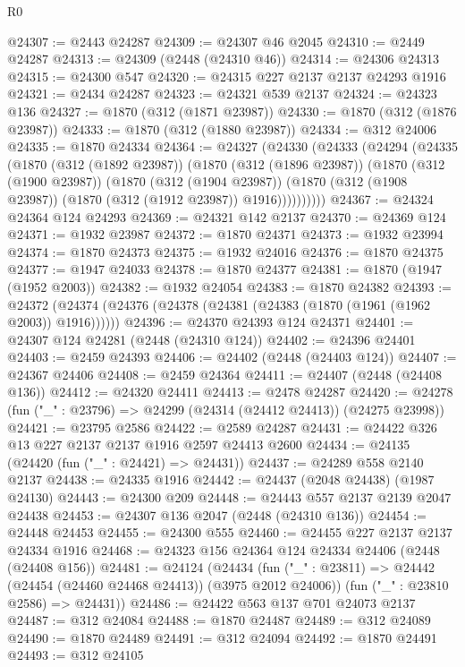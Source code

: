 \begin{lexlean}{R0}
\begin{coremodule}
@24307 := @2443 @24287
@24309 := @24307 @46 @2045
@24310 := @2449 @24287
@24313 := @24309 (@2448 (@24310 @46))
@24314 := @24306 @24313
@24315 := @24300 @547
@24320 := @24315 @227 @2137 @2137 @24293 @1916
@24321 := @2434 @24287
@24323 := @24321 @539 @2137
@24324 := @24323 @136
@24327 := @1870 (@312 (@1871 @23987))
@24330 := @1870 (@312 (@1876 @23987))
@24333 := @1870 (@312 (@1880 @23987))
@24334 := @312 @24006
@24335 := @1870 @24334
@24364 := @24327
    (@24330
      (@24333
        (@24294
          (@24335
            (@1870
              (@312 (@1892 @23987))
              (@1870
                (@312 (@1896 @23987))
                (@1870
                  (@312 (@1900 @23987))
                  (@1870
                    (@312 (@1904 @23987))
                    (@1870 (@312 (@1908 @23987)) (@1870 (@312 (@1912 @23987)) @1916))))))))))
@24367 := @24324 @24364 @124 @24293
@24369 := @24321 @142 @2137
@24370 := @24369 @124
@24371 := @1932 @23987
@24372 := @1870 @24371
@24373 := @1932 @23994
@24374 := @1870 @24373
@24375 := @1932 @24016
@24376 := @1870 @24375
@24377 := @1947 @24033
@24378 := @1870 @24377
@24381 := @1870 (@1947 (@1952 @2003))
@24382 := @1932 @24054
@24383 := @1870 @24382
@24393 := @24372 (@24374 (@24376 (@24378 (@24381 (@24383 (@1870 (@1961 (@1962 @2003)) @1916))))))
@24396 := @24370 @24393 @124 @24371
@24401 := @24307 @124 @24281 (@2448 (@24310 @124))
@24402 := @24396 @24401
@24403 := @2459 @24393
@24406 := @24402 (@2448 (@24403 @124))
@24407 := @24367 @24406
@24408 := @2459 @24364
@24411 := @24407 (@2448 (@24408 @136))
@24412 := @24320 @24411
@24413 := @2478 @24287
@24420 := @24278 (fun ("_" : @23796) => @24299 (@24314 (@24412 @24413)) (@24275 @23998))
@24421 := @23795 @2586
@24422 := @2589 @24287
@24431 := @24422 @326 @13 @227 @2137 @2137 @1916 @2597 @24413 @2600
@24434 := @24135 (@24420 (fun ("_" : @24421) => @24431))
@24437 := @24289 @558 @2140 @2137
@24438 := @24335 @1916
@24442 := @24437 (@2048 @24438) (@1987 @24130)
@24443 := @24300 @209
@24448 := @24443 @557 @2137 @2139 @2047 @24438
@24453 := @24307 @136 @2047 (@2448 (@24310 @136))
@24454 := @24448 @24453
@24455 := @24300 @555
@24460 := @24455 @227 @2137 @2137 @24334 @1916
@24468 := @24323 @156 @24364 @124 @24334 @24406 (@2448 (@24408 @156))
@24481 := @24124
    (@24434
      (fun ("_" : @23811) => @24442 (@24454 (@24460 @24468 @24413)) (@3975 @2012 @24006))
      (fun ("_" : @23810 @2586) => @24431))
@24486 := @24422 @563 @137 @701 @24073 @2137
@24487 := @312 @24084
@24488 := @1870 @24487
@24489 := @312 @24089
@24490 := @1870 @24489
@24491 := @312 @24094
@24492 := @1870 @24491
@24493 := @312 @24105

\end{coremodule}
\end{lexlean}
